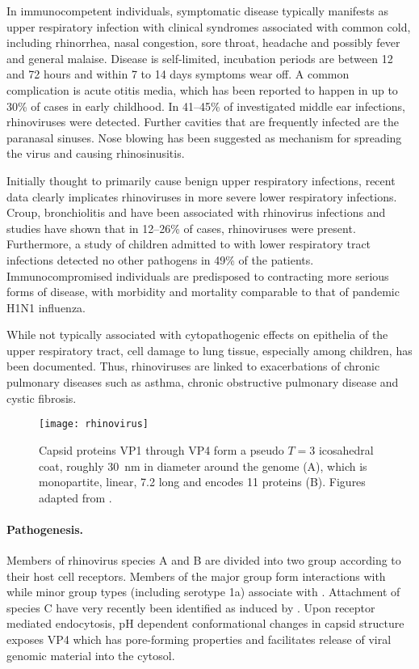 In immunocompetent individuals, symptomatic disease typically manifests as upper respiratory infection with clinical syndromes associated with common cold, including rhinorrhea, nasal congestion, sore throat, headache and possibly fever and general malaise. Disease is self-limited, incubation periods are between 12 and 72 hours and within 7 to 14 days symptoms wear off. A common complication is acute otitis media, which has been reported to happen in up to 30\% of cases in early childhood. In 41--45\% of investigated middle ear infections, rhinoviruses were detected. Further cavities that are frequently infected are the paranasal sinuses. Nose blowing has been suggested as mechanism for spreading the virus and causing rhinosinusitis.

Initially thought to primarily cause benign upper respiratory infections,  recent data clearly implicates rhinoviruses in more severe lower respiratory infections. Croup, bronchiolitis and  have been associated with rhinovirus infections and studies have shown that in 12--26\% of cases, rhinoviruses were present. Furthermore, a study of children admitted to  with lower respiratory tract infections detected no other pathogens in 49\% of the patients. Immunocompromised individuals are predisposed to contracting more serious forms of disease, with morbidity and mortality comparable to that of pandemic H1N1 influenza.

While not typically associated with cytopathogenic effects on epithelia of the upper respiratory tract, cell damage to lung tissue, especially among children, has been documented. Thus, rhinoviruses are linked to exacerbations of chronic pulmonary diseases such as asthma, chronic obstructive pulmonary disease and cystic fibrosis.

\begin{figure}
  \centering
  \texttt{[image: rhinovirus]}
  \caption[Capsid structure and genome of rhinoviruses.]{Capsid proteins VP1 through VP4 form a pseudo $T=3$ icosahedral coat, roughly \SI{30}{\nano\meter} in diameter around the  genome (A), which is monopartite, linear, \SI{7.2}{\kilobase} long and encodes 11 proteins (B). Figures adapted from \citet{Hulo2011}.}
  \label{fig:rhinovirus}
\end{figure}

\paragraph{Pathogenesis.}
Members of rhinovirus species A and B are divided into two group according to their host cell receptors. Members of the major group form interactions with  while minor group types (including serotype 1a) associate with . Attachment of species C have very recently been identified as induced by . Upon receptor mediated endocytosis, pH dependent conformational changes in capsid structure exposes VP4 which has pore-forming properties and facilitates release of viral genomic material into the cytosol.

